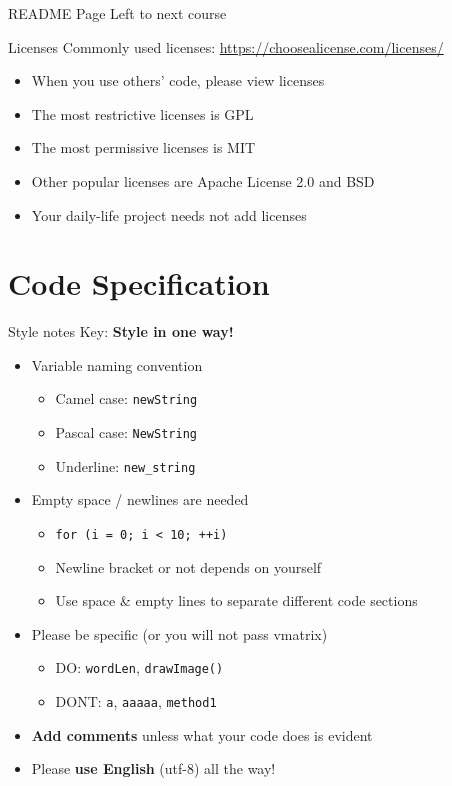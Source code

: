\documentclass{../TexTemplate/myslide}
\begin{document}
\begin{frame}{README Page}
Left to next course
\end{frame}

\begin{frame}{Licenses}
Commonly used licenses: \url{https://choosealicense.com/licenses/}
\begin{itemize}
	\item When you use others' code, please view licenses
	\item The most restrictive licenses is GPL
	\item The most permissive licenses is MIT
	\item Other popular licenses are Apache License 2.0 and BSD
	\item Your daily-life project needs not add licenses
\end{itemize}
\end{frame}

\section{Code Specification}
\begin{frame}
\sectionpage
\end{frame}

\begin{frame}[fragile]{Style notes}
Key: \textbf{Style in one way!}
\begin{itemize}
	\item Variable naming convention
	\begin{itemize}
		\item Camel case: \verb'newString'
		\item Pascal case: \verb'NewString'
		\item Underline: \verb'new_string'
	\end{itemize}
	\item Empty space / newlines are needed
	\begin{itemize}
		\item \verb'for (i = 0; i < 10; ++i)'
		\item Newline bracket or not depends on yourself
		\item Use space \& empty lines to separate different code sections
	\end{itemize}
	\item Please be specific (or you will not pass vmatrix)
	\begin{itemize}
		\item DO: \verb'wordLen', \verb'drawImage()'
		\item DONT: \verb'a', \verb'aaaaa', \verb'method1'
	\end{itemize}
	\item \textbf{Add comments} unless what your code does is evident
	\item Please \textbf{use English} (utf-8) all the way!
\end{itemize}
\end{frame}
\end{document}
